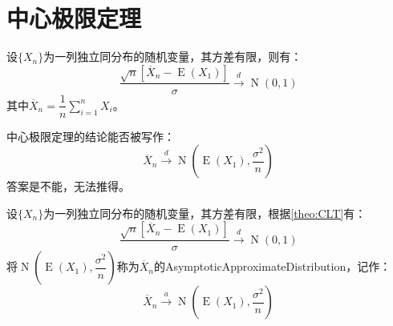 \section{中心极限定理}

\begin{theorem}\label{theo:CLT}
	设$\{X_n\}$为一列独立同分布的随机变量，其方差有限，则有：
	\begin{equation*}
		\frac{\sqrt{n}[\overline{X}_n-\operatorname{E}(X_1)]}{\sigma}\overset{d}{\longrightarrow}\operatorname{N}(0,1)
	\end{equation*}
	其中$\overline{X}_n=\dfrac{1}{n}\sum\limits_{i=1}^{n}X_i$。
\end{theorem}
\begin{note}
	中心极限定理的结论能否被写作：
	\begin{equation*}
		\overline{X}_n\overset{d}{\longrightarrow}\operatorname{N}\left(\operatorname{E}(X_1),\frac{\sigma^2}{n}\right)
	\end{equation*}
	答案是不能，无法推得。
\end{note}
\begin{definition}
	设$\{X_n\}$为一列独立同分布的随机变量，其方差有限，根据\cref{theo:CLT}有：
	\begin{equation*}
		\frac{\sqrt{n}[\overline{X}_n-\operatorname{E}(X_1)]}{\sigma}\overset{d}{\longrightarrow}\operatorname{N}(0,1)
	\end{equation*}
	将$\operatorname{N}\left(\operatorname{E}(X_1),\dfrac{\sigma^2}{n}\right)$称为$\overline{X}_n$的\gls{AsymptoticApproximateDistribution}，记作：
	\begin{equation*}
		\overline{X}_n\overset{a}{\longrightarrow}\operatorname{N}\left(\operatorname{E}(X_1),\frac{\sigma^2}{n}\right)
	\end{equation*}
\end{definition}